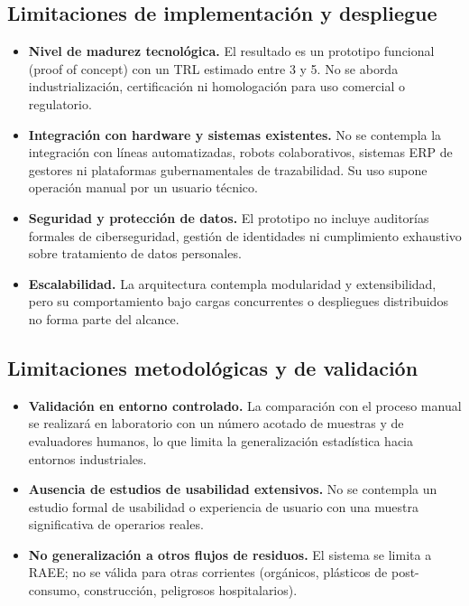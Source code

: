 \subsection{Limitaciones de implementación y despliegue}
\begin{itemize}
    \item \textbf{Nivel de madurez tecnológica.} El resultado es un prototipo funcional (proof of concept) con un TRL estimado entre 3 y 5. No se aborda industrialización, certificación ni homologación para uso comercial o regulatorio.
    \item \textbf{Integración con hardware y sistemas existentes.} No se contempla la integración con líneas automatizadas, robots colaborativos, sistemas ERP de gestores ni plataformas gubernamentales de trazabilidad. Su uso supone operación manual por un usuario técnico.
    \item \textbf{Seguridad y protección de datos.} El prototipo no incluye auditorías formales de ciberseguridad, gestión de identidades ni cumplimiento exhaustivo sobre tratamiento de datos personales.
    \item \textbf{Escalabilidad.} La arquitectura contempla modularidad y extensibilidad, pero su comportamiento bajo cargas concurrentes o despliegues distribuidos no forma parte del alcance.
\end{itemize}

\subsection{Limitaciones metodológicas y de validación}
\begin{itemize}
    \item \textbf{Validación en entorno controlado.} La comparación con el proceso manual se realizará en laboratorio con un número acotado de muestras y de evaluadores humanos, lo que limita la generalización estadística hacia entornos industriales.
    \item \textbf{Ausencia de estudios de usabilidad extensivos.} No se contempla un estudio formal de usabilidad o experiencia de usuario con una muestra significativa de operarios reales.
    \item \textbf{No generalización a otros flujos de residuos.} El sistema se limita a RAEE; no se válida para otras corrientes (orgánicos, plásticos de post-consumo, construcción, peligrosos hospitalarios).
\end{itemize}

